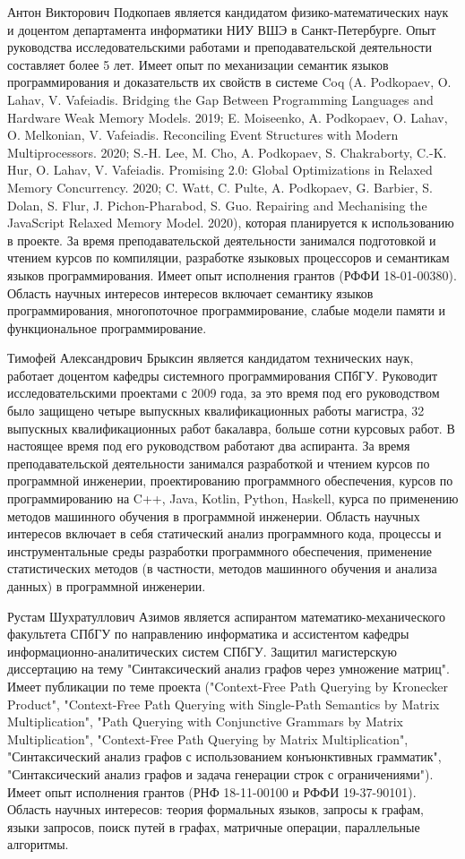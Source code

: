 \documentclass[12pt]{article}  %
\theoremstyle{remark}
\begin{document}
Антон Викторович Подкопаев является кандидатом физико-математических наук и доцентом
департамента информатики НИУ ВШЭ в Санкт-Петербурге. Опыт руководства исследовательскими работами и
преподавательской деятельности составляет более 5 лет. Имеет опыт по механизации семантик языков программирования и доказательств их свойств в системе Coq (A. Podkopaev, O. Lahav, V. Vafeiadis. Bridging the Gap Between Programming Languages and Hardware Weak Memory Models. 2019; E. Moiseenko, A. Podkopaev, O. Lahav, O. Melkonian, V. Vafeiadis. Reconciling Event Structures with Modern Multiprocessors. 2020; S.-H. Lee, M. Cho, A. Podkopaev, S. Chakraborty, C.-K. Hur, O. Lahav, V. Vafeiadis. Promising 2.0: Global Optimizations in Relaxed Memory Concurrency. 2020; C. Watt, C. Pulte, A. Podkopaev, G. Barbier, S. Dolan, S. Flur, J. Pichon-Pharabod, S. Guo. Repairing and Mechanising the JavaScript Relaxed Memory Model. 2020), которая планируется к использованию в проекте. За время преподавательской деятельности занимался подготовкой и чтением курсов по компиляции, разработке языковых процессоров и семантикам языков программирования. Имеет опыт исполнения грантов (РФФИ 18-01-00380). Область научных интересов интересов включает семантику языков программирования, многопоточное программирование, слабые модели памяти и функциональное программирование.

Тимофей Александрович Брыксин является кандидатом технических наук, работает доцентом кафедры системного программирования СПбГУ. Руководит исследовательскими проектами с 2009 года, за это время под его руководством было защищено четыре выпускных квалификационных работы магистра, 32 выпускных квалификационных работ бакалавра, больше сотни курсовых работ. В настоящее время под его руководством работают два аспиранта. За время преподавательской деятельности занимался разработкой и чтением курсов по программной инженерии, проектированию программного обеспечения, курсов по программированию на C++, Java, Kotlin, Python, Haskell, курса по применению методов машинного обучения в программной инженерии. Область научных интересов включает в себя статический анализ программного кода, процессы и инструментальные среды разработки программного обеспечения, применение статистических методов (в частности, методов машинного обучения и анализа данных) в программной инженерии.

Рустам Шухратуллович Азимов является аспирантом математико-механического факультета СПбГУ по направлению информатика и ассистентом кафедры информационно-аналитических систем СПбГУ. Защитил магистерскую диссертацию на тему "Синтаксический анализ графов через умножение матриц". Имеет публикации по теме проекта ("Context-Free Path Querying by Kronecker Product", "Context-Free Path Querying with Single-Path Semantics by Matrix Multiplication", "Path Querying with Conjunctive Grammars by Matrix Multiplication", "Context-Free Path Querying by Matrix Multiplication", "Синтаксический анализ графов с использованием конъюнктивных грамматик", "Синтаксический анализ графов и задача генерации строк с ограничениями"). Имеет опыт исполнения грантов (РНФ 18-11-00100 и РФФИ 19-37-90101). Область научных интересов: теория формальных языков, запросы к графам, языки запросов, поиск путей в графах, матричные операции, параллельные алгоритмы.
\end{document}

